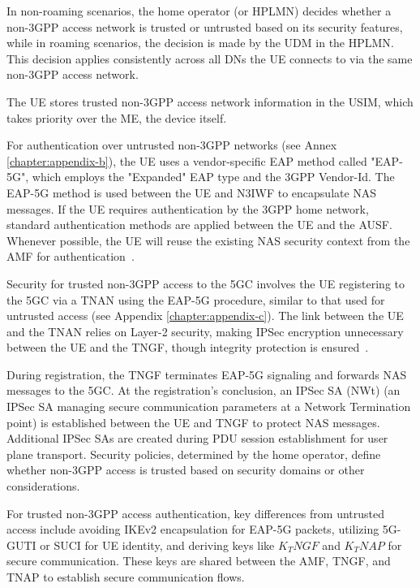 In non-roaming scenarios, the home operator (or \ac{HPLMN}) decides whether a non-\ac{3GPP} access network is trusted or untrusted based on its security features, while in roaming scenarios, the decision is made by the \ac{UDM} in the \ac{HPLMN}. This decision applies consistently across all \acp{DN} the \ac{UE} connects to via the same non-\ac{3GPP} access network.

The \ac{UE} stores trusted non-\ac{3GPP} access network information in the \ac{USIM}, which takes priority over the \ac{ME}, the device itself.

For authentication over untrusted non-\ac{3GPP} networks (see Annex \ref{chapter:appendix-b}), the \ac{UE} uses a vendor-specific \ac{EAP} method called "EAP-5G", which employs the "Expanded" \ac{EAP} type and the \ac{3GPP} Vendor-Id. The \ac{EAP-5G} method is used between the \ac{UE} and \ac{N3IWF} to encapsulate \ac{NAS} messages. If the \ac{UE} requires authentication by the \ac{3GPP} home network, standard authentication methods are applied between the \ac{UE} and the \ac{AUSF}. Whenever possible, the \ac{UE} will reuse the existing \ac{NAS} security context from the \ac{AMF} for authentication~\cite{33.501-p128}.

Security for trusted non-\ac{3GPP} access to the \ac{5GC} involves the \ac{UE} registering to the \ac{5GC} via a \ac{TNAN} using the \ac{EAP-5G} procedure, similar to that used for untrusted access (see Appendix \ref{chapter:appendix-c}). The link between the \ac{UE} and the \ac{TNAN} relies on Layer-2 security, making \ac{IPSec} encryption unnecessary between the \ac{UE} and the \ac{TNGF}, though integrity protection is ensured~\cite{33.501-p132}.

During registration, the \ac{TNGF} terminates \ac{EAP-5G} signaling and forwards \ac{NAS} messages to the \ac{5GC}. At the registration's conclusion, an \ac{IPSec SA (NWt)} (an \acl{IPSec SA} managing secure communication parameters at a Network Termination point) is established between the \ac{UE} and \ac{TNGF} to protect \ac{NAS} messages. Additional \acp{IPSec SA} are created during \ac{PDU} session establishment for user plane transport. Security policies, determined by the home operator, define whether non-\ac{3GPP} access is trusted based on security domains or other considerations.

For trusted non-\ac{3GPP} access authentication, key differences from untrusted access include avoiding \ac{IKEv2} encapsulation for \ac{EAP-5G} packets, utilizing \ac{5G-GUTI} or \ac{SUCI} for \ac{UE} identity, and deriving keys like $K_TNGF$ and $K_TNAP$ for secure communication. These keys are shared between the \ac{AMF}, \ac{TNGF}, and \ac{TNAP} to establish secure communication flows.

